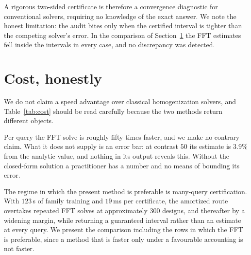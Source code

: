 A rigorous two-sided certificate is therefore a convergence diagnostic for
conventional solvers, requiring no knowledge of the exact answer. We note
the honest limitation: the audit bites only when the certified interval is
tighter than the competing solver's error. In the comparison of
Section~\ref{sec:cost} the FFT estimates fell inside the intervals in every
case, and no discrepancy was detected.

\section{Cost, honestly}
\label{sec:cost}

We do not claim a speed advantage over classical homogenization solvers,
and Table~\ref{tab:cost} should be read carefully because the two methods return
different objects.

\begin{table}[t]
\centering
\caption{Certified intervals against an FFT (Moulinec--Suquet) estimate,
two-phase checkerboard. The FFT returns a point estimate with unknown
error; the certified interval provably contains the exact tensor. Exact
values $2.2361$ and $7.0711$.}
\label{tab:cost}

\end{table}

Per query the FFT solve is roughly fifty times faster, and we make no
contrary claim. What it does not supply is an error bar: at contrast $50$
its estimate is $3.9\%$ from the analytic value, and nothing in its output
reveals this. Without the closed-form solution a practitioner has a number
and no means of bounding its error.

The regime in which the present method is preferable is many-query
certification. With $123$\,s of family training and $19$\,ms per
certificate, the amortized route overtakes repeated FFT solves at
approximately $300$ designs, and thereafter by a widening margin, while returning a guaranteed interval rather than an estimate at every query. We
present the comparison including the rows in which the FFT is preferable,
since a method that is faster only under a favourable accounting is not
faster.

